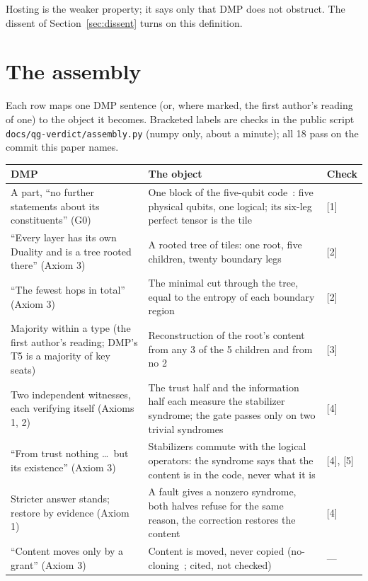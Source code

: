 \documentclass[11pt,a4paper]{article}
\theoremstyle{definition}
\theoremstyle{remark}
\newcommand{\chk}[1]{\textsf{[#1]}}
\begin{document}
\noindent Hosting is the weaker property; it says only that DMP does not obstruct. The dissent of Section~\ref{sec:dissent} turns on
this definition.

\section{The assembly}\label{sec:assembly}

Each row maps one DMP sentence (or, where marked, the first author's reading of one) to the object it becomes. Bracketed labels are checks in the public script
\texttt{docs/qg-verdict/assembly.py} (numpy only, about a minute); all 18 pass on the commit this paper names.

\begin{center}\small
\begin{tabularx}{\linewidth}{@{}LLl@{}}
\toprule
DMP & The object & Check \\
\midrule
A part, ``no further statements about its constituents'' (G0) & One block of the five-qubit code~\cite{laflamme}: five physical qubits, one
logical; its six-leg perfect tensor is the tile & \chk{1} \\
``Every layer has its own Duality and is a tree rooted there'' (Axiom 3) & A rooted tree of tiles: one root, five children, twenty
boundary legs & \chk{2} \\
``The fewest hops in total'' (Axiom 3) & The minimal cut through the tree, equal to the entropy of each boundary region & \chk{2} \\
Majority within a type (the first author's reading; DMP's T5 is a majority of key seats) & Reconstruction of the root's content from any 3 of the 5 children and from no 2 & \chk{3} \\
Two independent witnesses, each verifying itself (Axioms 1, 2) & The trust half and the information half each measure the stabilizer
syndrome; the gate passes only on two trivial syndromes & \chk{4} \\
``From trust nothing \ldots\ but its existence'' (Axiom 3) & Stabilizers commute with the logical operators: the syndrome says that the
content is in the code, never what it is & \chk{4}, \chk{5} \\
Stricter answer stands; restore by evidence (Axiom 1) & A fault gives a nonzero syndrome, both halves refuse for the same reason, the
correction restores the content & \chk{4} \\
``Content moves only by a grant'' (Axiom 3) & Content is moved, never copied (no-cloning~\cite{wz,dieks}; cited, not checked) & --- \\
\bottomrule
\end{tabularx}
\end{center}
\end{document}
